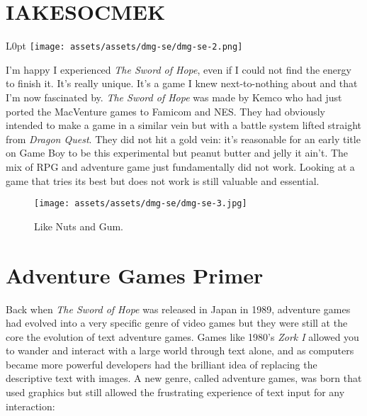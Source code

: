 \documentclass{book}
\begin{document}
\newpage\FloatBarrier\needspace{10mm}\section*{IAKESOCMEK}\nopagebreak[4]
\begin{wrapfigure}{L}{0pt} \texttt{[image: assets/assets/dmg-se/dmg-se-2.png]}\end{wrapfigure}
I’m happy I experienced \emph{The Sword of Hope}, even if I could not find the energy to finish it. It’s really unique. It’s a game I knew next-to-nothing about and that I’m now fascinated by. \emph{The Sword of Hope} was made by Kemco who had just ported the MacVenture games to Famicom and NES. They had obviously intended to make a game in a similar vein but with a battle system lifted straight from \emph{Dragon Quest}. They did not hit a gold vein: it’s reasonable for an early title on Game Boy to be this experimental but peanut butter and jelly it ain’t. The mix of RPG and adventure game just fundamentally did not work. Looking at a game that tries its best but does not work is still valuable and essential.

\begin{figure}[hbt]
\vskip 10pt
\centering \texttt{[image: assets/assets/dmg-se/dmg-se-3.jpg]}\par\pagetwodescription Like Nuts and Gum.
\vskip 6pt
\end{figure}

\FloatBarrier\needspace{10mm}\section*{Adventure Games Primer}\nopagebreak[4]

Back when \emph{The Sword of Hope} was released in Japan in 1989, adventure games had evolved into a very specific genre of video games but they were still at the core the evolution of text adventure games. Games like 1980’s \emph{Zork I} allowed you to wander and interact with a large world through text alone, and as computers became more powerful developers had the brilliant idea of replacing the descriptive text with images. A new genre, called adventure games, was born that used graphics but still allowed the frustrating experience of text input for any interaction:

\end{document}
